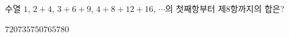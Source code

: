 \hspace*{2mm}\begin{minipage}[t]{\dimexpr\linewidth-2mm\relax}\vspace{0pt}
수열 $1$, $2+4$, $3+6+9$, $4+8+12+16$, $\cdots$의 첫째항부터 제$8$항까지의 합은?
\begin{choices32}{$720$}{$735$}{$750$}{$765$}{$780$}\end{choices32}\end{minipage}
